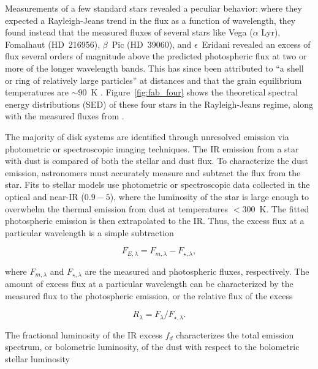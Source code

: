     Measurements of a few standard stars revealed a peculiar behavior: where they expected a Rayleigh-Jeans trend in the flux as a function of wavelength, they found instead that the measured fluxes of several stars like Vega ($\alpha$ Lyr), Fomalhaut (HD~216956), $\beta$~Pic (HD~39060), and $\epsilon$~Eridani revealed an excess of flux several orders of magnitude above the predicted photospheric flux at two or more of the longer wavelength bands. This has since been attributed to ``a shell or ring of relatively large particles'' at distances and that the grain equilibrium temperatures are $\sim90$~K \citep{Aumann1984, Backman1993}. Figure~\ref{fig:fab_four} shows the theoretical spectral energy distributions (SED) of these four stars in the Rayleigh-Jeans regime, along with the measured fluxes from \iras.
    

    The majority of disk systems are identified through unresolved emission via photometric or spectroscopic imaging techniques. The IR emission from a star with dust is compared of both the stellar and dust flux. To characterize the dust emission, astronomers must accurately measure and subtract the flux from the star. Fits to stellar models use photometric or spectroscopic data collected in the optical and near-IR ($0.9-5$\micron), where the luminosity of the star is large enough to overwhelm the thermal emission from dust at temperatures $<300$~K. The fitted photospheric emission is then extrapolated to the IR. Thus, the excess flux at a particular wavelength is a simple subtraction
    
    \begin{equation}\label{eq:excess+flux}
    F_{E,\lambda} = F_{m,\lambda} - F_{\star,\lambda},
    \end{equation}
    
    \noindent where $F_{m,\lambda}$ and $F_{\star,\lambda}$ are the measured and photospheric fluxes, respectively. The amount of excess flux at a particular wavelength can be characterized by the measured flux to the photospheric emission, or the relative flux of the excess
        
        \begin{equation}\label{eq:rel_excess}
        R_\lambda = F_\lambda / F_{\star,\lambda}.
        \end{equation}
        
        \noindent The fractional luminosity of the IR excess $f_d$ characterizes the total emission spectrum, or bolometric luminosity, of the dust with respect to the bolometric stellar luminosity
        
